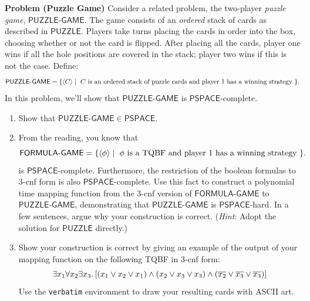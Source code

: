 \documentclass[12pt]{article}
\newcommand{\hint}[1]{(\emph{Hint}: #1)}
\newcounter{ProblemCounter}
\newenvironment{problem}[1][]
  {\refstepcounter{ProblemCounter}\noindent\textbf{Problem \theProblemCounter{} (#1)}\quad}
  {\newpage}
\newcommand{\answerbelow}{\noindent\makebox[\linewidth]{\rule{\textwidth}{0.4pt}}}
\newcommand{\pspace}{\ensuremath{\mathsf{PSPACE}}\xspace}
\newcommand{\prob}[1]{\ensuremath{\textsf{#1}}\xspace}
\newcommand{\desc}[1]{\ensuremath{\langle #1 \rangle}}
\begin{document}
\begin{problem}[Puzzle Game]
  Consider a related problem, the two-player \emph{puzzle game},
  \prob{PUZZLE-GAME}.  The game consists of an \emph{ordered} stack of cards as
  described in \prob{PUZZLE}.  Players take turns placing the cards in order
  into the box, choosing whether or not the card is flipped.  After placing all
  the cards, player one wins if all the hole positions are covered in the
  stack; player two wins if this is not the case.  Define:
  \[
    \prob{PUZZLE-GAME} = \{ \desc{C} \mid \text{ \( C \) is an ordered stack of puzzle cards and player 1 has a winning strategy } \}.
  \]
  In this problem, we'll show that \prob{PUZZLE{-}GAME} is \pspace-complete.
  \begin{enumerate}[itemsep=0pt]
    \item Show that \( \prob{PUZZLE-GAME} \in \pspace \).
    \item From the reading, you know that
      \[
        \prob{FORMULA-GAME} = \{ \desc{\phi} \mid \text{ \( \phi \) is a TQBF and player 1 has a winning strategy } \}.
      \]
      is \pspace-complete.  Furthermore, the restriction of the boolean
      formulas to 3-cnf form is also \pspace-complete.  Use this fact to
      construct a polynomial time mapping function from the 3-cnf version of
      \prob{FORMULA-GAME} to \prob{PUZZLE{-}GAME}, demonstrating that
      \prob{PUZZLE-GAME} is \pspace-hard.  In a few sentences, argue why your
      construction is correct.  \hint{Adopt the solution for \prob{PUZZLE}
      directly.}
    \item Show your construction is correct by giving an example of the output
      of your mapping function on the following TQBF in 3-cnf form:
      \[
        \exists x_1 \forall x_2 \exists x_3 \ldotp [ (x_1 \vee x_2 \vee x_1) \wedge (x_2 \vee x_3 \vee x_3) \wedge (\overline{x_2} \vee \overline{x_3} \vee \overline{x_3}) ]
      \]
      Use the \texttt{verbatim} environment to draw your resulting cards with
      ASCII art.
  \end{enumerate}

\answerbelow{}


\end{problem}

\end{document}
